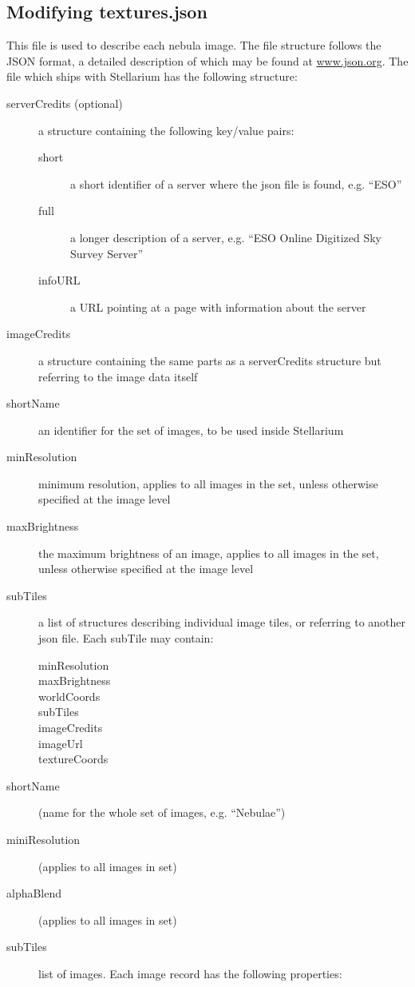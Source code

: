 \subsection{Modifying textures.json}%
\label{sec:dso:modifyingTexturesJson}

This file is used to describe each nebula image. The file structure
follows the JSON format, a detailed description of which may be found
at \url{www.json.org}. The  file which ships with
Stellarium has the following structure:


\begin{description}
\item[serverCredits (optional)] a structure containing the following
  key/value pairs:

  \begin{description}
  \item[short] a short identifier of a server where the json file is found, e.g. ``ESO''
  \item[full]  a longer description of a server, e.g. ``ESO Online Digitized Sky Survey Server''
  \item[infoURL] a URL pointing at a page with information about the server
  \end{description}
\item[imageCredits] a structure containing the same parts as a
  serverCredits structure but referring to the image data itself
\item[shortName] an identifier for the set of images, to be used inside Stellarium
\item[minResolution] minimum resolution, applies to all images in the set,
  unless otherwise specified at the image level
\item[maxBrightness] the maximum brightness of an image, applies to all
  images in the set, unless otherwise specified at the image level
\item[subTiles] a list of structures describing individual image tiles, or
  referring to another json file. Each subTile may contain:

  \begin{description}
  \item[minResolution]
  \item[maxBrightness]
  \item[worldCoords]
  \item[subTiles]
  \item[imageCredits]
  \item[imageUrl]
  \item[textureCoords]
  \end{description}
\item[shortName] (name for the whole set of images, e.g. ``Nebulae'')
\item[miniResolution] (applies to all images in set)
\item[alphaBlend] (applies to all images in set)
\item[subTiles] list of images. Each image record has the following properties:


\end{description}
